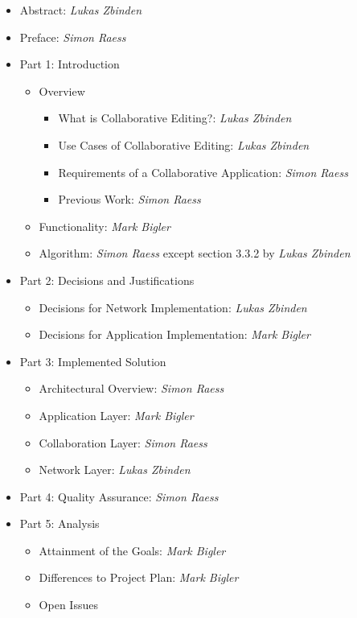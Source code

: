 \begin{itemize}
 \item Abstract: \emph{Lukas Zbinden}
 \item Preface: \emph{Simon Raess}
 \item Part 1: Introduction
 \begin{itemize}
  \item Overview 
  \begin{itemize}
   \item What is Collaborative Editing?: \emph{Lukas Zbinden}
   \item Use Cases of Collaborative Editing: \emph{Lukas Zbinden}
   \item Requirements of a Collaborative Application: \emph{Simon Raess}
   \item Previous Work: \emph{Simon Raess}
  \end{itemize}
  \item Functionality: \emph{Mark Bigler}
  \item Algorithm: \emph{Simon Raess} except section 3.3.2 by \emph{Lukas Zbinden}
 \end{itemize}
 \item Part 2: Decisions and Justifications
 \begin{itemize}
  \item Decisions for Network Implementation: \emph{Lukas Zbinden}
  \item Decisions for Application Implementation: \emph{Mark Bigler}
 \end{itemize}
 \item Part 3: Implemented Solution
 \begin{itemize}
  \item Architectural Overview: \emph{Simon Raess}
  \item Application Layer: \emph{Mark Bigler}
  \item Collaboration Layer: \emph{Simon Raess}
  \item Network Layer: \emph{Lukas Zbinden}
 \end{itemize}
 \item Part 4: Quality Assurance: \emph{Simon Raess}
 \item Part 5: Analysis
 \begin{itemize}
  \item Attainment of the Goals: \emph{Mark Bigler}
  \item Differences to Project Plan: \emph{Mark Bigler}
  \item Open Issues
  \begin{itemize}

\end{itemize}
\end{itemize}
\end{itemize}
